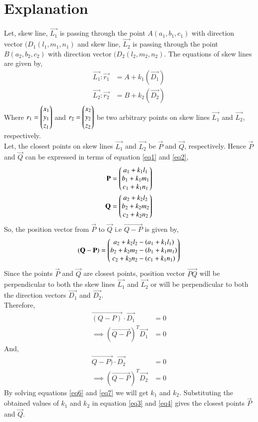 \documentclass[journal,12pt,twocolumn]{IEEEtran}
\begin{document}
\section{Explanation}
Let, skew line, $\vec{L_1}$ is passing through the point $A(a_1,b_1,c_1)$ with direction vector $(D_1(l_1,m_1,n_1)$ and skew line, $\vec{L_2}$ is passing through the point $B(a_2,b_2,c_2)$  with direction vector $(D_2(l_2,m_2,n_2)$. The equations of skew lines are given by,
\begin{align}
\vec{L_1}: \vec{r_1}&=A+k_1(\vec{D_1})\label{eq1}\\
\vec{L_2}: \vec{r_2}&=B+k_2(\vec{D_2})\label{eq2}
\end{align}
Where $r_1=\begin{pmatrix}x_1\\y_1\\z_1\end{pmatrix}$ and $r_2=\begin{pmatrix}x_2\\ y_2\\z_2\end{pmatrix}$ be two arbitrary points on skew lines $\vec{L_1}$ and $\vec{L_2}$, respectively. \\
Let, the closest points on skew lines $\vec{L_1}$ and $\vec{L_2}$ be $\vec{P}$ and $\vec{Q}$, respectively. Hence $\vec{P}$ and $\vec{Q}$ can be expressed in terms of equation \eqref{eq1} and \eqref{eq2},
\begin{align}
\mathbf{P}=\begin{pmatrix}a_1+k_1l_1\\b_1+k_1m_1\\c_1+k_1n_1\end{pmatrix}\label{eq3}\\
\mathbf{Q}=\begin{pmatrix}a_2+k_2l_2\\b_2+k_2m_2\\c_2+k_2n_2\end{pmatrix}\label{eq4}
\end{align}
So, the position vector from $\vec{P}$ to $\vec{Q}$ i.e $\vec{Q-P}$ is given by, 
\begin{align}
\mathbf{(Q-P)}=\begin{pmatrix}a_2+k_2l_2-(a_1+k_1l_1)\\b_2+k_2m_2-(b_1+k_1m_1)\\
c_2+k_2n_2-(c_1+k_1n_1)\end{pmatrix}\label{eq5}
\end{align}
Since the points $\vec{P}$ and $\vec{Q}$ are closest points, position vector $\vec{PQ}$ will be perpendicular to both the skew lines $\vec{L_1}$ and $\vec{L_2}$ or will be perpendicular to both the direction vectors $\vec{D_1}$ and $\vec{D_2}$.\\ 
Therefore,
\begin{align}
\vec{(Q-P)}\cdot\vec{D_1}&=0\\
\implies(\vec{Q-P})^T\vec{D_1}&=0\label{eq6}
\end{align}
And,
\begin{align}
\vec{Q-P)}\cdot\vec{D_2}&=0\\
\implies(\vec{Q-P})^T\vec{D_2}&=0\label{eq7}
\end{align}
By solving equations \ref{eq6} and \ref{eq7} we will get $k_1$ and $k_2$. Substituting the obtained values of $k_1$ and $k_2$ in equation \ref{eq3} and \ref{eq4} gives the closest points $\vec{P}$ and $\vec{Q}$.
\end{document}
